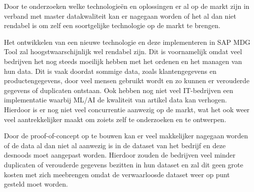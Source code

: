 Door te onderzoeken welke technologieën en oplossingen er al op de markt zijn in verband met master datakwaliteit kan er nagegaan worden of het al dan niet rendabel is om zelf een soortgelijke technologie op de markt te brengen. 

Het ontwikkelen van een nieuwe technologie en deze implementeren in SAP MDG Tool zal hoogstwaarschijnlijk wel rendabel zijn. Dit is voornamelijk omdat veel bedrijven het nog steeds moeilijk hebben met het ordenen en het managen van hun data. Dit is vaak doordat sommige data, zoals klantengegevens en productengegevens, door veel mensen gebruikt wordt en zo kunnen er verouderde gegevens of duplicaten ontstaan. Ook hebben nog niet veel IT-bedrijven een implementatie waarbij ML/AI de kwaliteit van artikel data kan verhogen. Hierdoor is er nog niet veel concurrentie aanwezig op de markt, wat het ook weer veel aantrekkelijker maakt om zoiets zelf te onderzoeken en te ontwerpen. 

Door de proof-of-concept op te bouwen kan er veel makkelijker nagegaan worden of de data al dan niet al aanwezig is in de dataset van het bedrijf en deze desnoods moet aangepast worden. Hierdoor zouden de bedrijven veel minder duplicaten of verouderde gegevens bezitten in hun dataset en zal dit geen grote kosten met zich meebrengen omdat de verwaarloosde dataset weer op punt gesteld moet worden.

